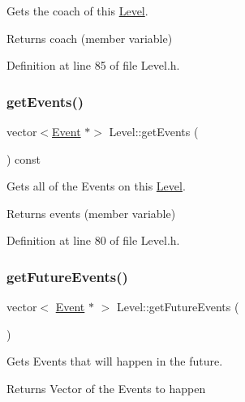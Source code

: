 Gets the coach of this \hyperlink{class_level}{Level}. 

\begin{DoxyReturn}{Returns}
coach (member variable) 
\end{DoxyReturn}


Definition at line 85 of file Level.\+h.

\hypertarget{class_level_aa03432096cfcf42293cebf2c801b7437}{}\label{class_level_aa03432096cfcf42293cebf2c801b7437} 
\subsubsection{\texorpdfstring{get\+Events()}{getEvents()}}
{\footnotesize\ttfamily vector$<$\hyperlink{class_event}{Event} $\ast$$>$ Level\+::get\+Events (\begin{DoxyParamCaption}{ }\end{DoxyParamCaption}) const\hspace{0.3cm}{\ttfamily [inline]}}



Gets all of the Events on this \hyperlink{class_level}{Level}. 

\begin{DoxyReturn}{Returns}
events (member variable) 
\end{DoxyReturn}


Definition at line 80 of file Level.\+h.

\hypertarget{class_level_a2c4cb023c042409bd7551a91f369a990}{}\label{class_level_a2c4cb023c042409bd7551a91f369a990} 
\subsubsection{\texorpdfstring{get\+Future\+Events()}{getFutureEvents()}}
{\footnotesize\ttfamily vector$<$ \hyperlink{class_event}{Event} $\ast$ $>$ Level\+::get\+Future\+Events (\begin{DoxyParamCaption}{ }\end{DoxyParamCaption})}



Gets Events that will happen in the future. 

\begin{DoxyReturn}{Returns}
Vector of the Events to happen 
\end{DoxyReturn}


